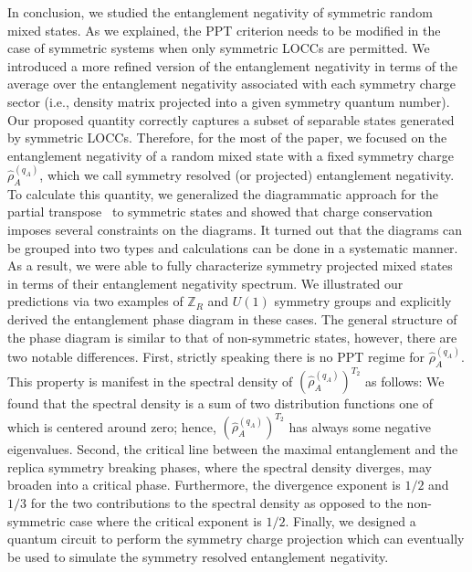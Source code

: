 \documentclass[aps,pra,reprint,superscriptaddress,twocolumn,notitlepage]{revtex4-1}
\newcommand{\Z}{\mathbb{Z}}
\numberwithin{equation}{section}
\begin{document}
In conclusion, we studied the entanglement negativity of symmetric random mixed states.
As we explained, the PPT criterion needs to be modified in the case of symmetric systems when only symmetric LOCCs are permitted. We introduced a more refined version of the entanglement negativity in terms of the average over the entanglement negativity associated with each symmetry charge sector (i.e., density matrix projected into a given symmetry quantum number). Our proposed quantity correctly captures a subset of separable states generated by symmetric LOCCs. Therefore, for the most of the paper, we focused on 
the entanglement negativity of a random mixed state with a fixed symmetry charge $\hat \rho_A^{(q_A)}$, which we call symmetry resolved (or projected) entanglement negativity.
To calculate this quantity, we generalized the diagrammatic approach for the partial transpose~\cite{Shapourian2021} to symmetric states and showed that charge conservation imposes several constraints on the diagrams. 
It turned out that the diagrams can be grouped into two types and calculations can be done in a systematic manner. 
As a result, we were able to fully characterize symmetry projected mixed states in terms of their entanglement negativity spectrum.
We illustrated our predictions via two examples of $\Z_R$ and $U(1)$ symmetry groups and explicitly derived the entanglement phase diagram in these cases.
The general structure of the phase diagram is similar to that of non-symmetric states, however, there are two notable differences.  
First, strictly speaking there is no PPT regime for $\hat \rho_A^{(q_A)}$. This property is manifest in the spectral density of $(\hat \rho_A^{(q_A)})^{T_2}$ as follows: We found that the spectral density is a sum of two distribution functions one of which is centered around zero; hence, $(\hat \rho_A^{(q_A)})^{T_2}$ has always some negative eigenvalues. Second, the critical line between the maximal entanglement and the replica symmetry breaking phases, where the spectral density diverges, may broaden into a critical phase. Furthermore, the divergence exponent is $1/2$ and $1/3$ for the  two contributions to the spectral density as opposed to the non-symmetric case where the critical exponent is $1/2$.
Finally, we designed a quantum circuit to perform the symmetry charge projection which can eventually be used to simulate the symmetry resolved entanglement negativity.
\end{document}
